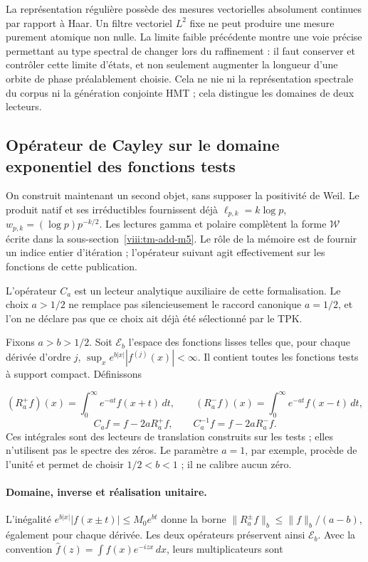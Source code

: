 La représentation régulière possède des mesures vectorielles absolument continues par rapport à Haar. Un filtre vectoriel \(L^2\) fixe ne peut produire une mesure purement atomique non nulle. La limite faible précédente montre une voie précise permettant au type spectral de changer lors du raffinement : il faut conserver et contrôler cette limite d'états, et non seulement augmenter la longueur d'une orbite de phase préalablement choisie. Cela ne nie ni la représentation spectrale du corpus ni la génération conjointe HMT ; cela distingue les domaines de deux lecteurs.


\subsection{Opérateur de Cayley sur le domaine exponentiel des fonctions tests}
\label{viii:tm-add-m4}
On construit maintenant un second objet, sans supposer la positivité de Weil. Le produit natif et ses irréductibles fournissent déjà \(\ell_{p,k}=k\log p\), \(w_{p,k}=(\log p)p^{-k/2}\). Les lectures gamma et polaire complètent la forme \(\mathscr W\) écrite dans la sous-section~\ref{viii:tm-add-m5}. Le rôle de la mémoire est de fournir un indice entier d'itération ; l'opérateur suivant agit effectivement sur les fonctions de cette publication.

L'opérateur \(C_a\) est un lecteur analytique auxiliaire de cette formalisation. Le choix \(a>1/2\) ne remplace pas silencieusement le raccord canonique \(a=1/2\), et l'on ne déclare pas que ce choix ait déjà été sélectionné par le TPK.

Fixons \(a>b>1/2\). Soit \(\mathscr E_b\) l'espace des fonctions lisses telles que, pour chaque dérivée d'ordre \(j\), \(\sup_x e^{b|x|}|f^{(j)}(x)|<\infty\). Il contient toutes les fonctions tests à support compact. Définissons

\[
(R_a^+f)(x)=\int_0^\infty e^{-at}f(x+t)\,dt,
\qquad
(R_a^-f)(x)=\int_0^\infty e^{-at}f(x-t)\,dt,
\]
\[
\boxed{C_af=f-2aR_a^+f,\qquad C_a^{-1}f=f-2aR_a^-f.}
\]
Ces intégrales sont des lecteurs de translation construits sur les tests ; elles n'utilisent pas le spectre des zéros. Le paramètre \(a=1\), par exemple, procède de l'unité et permet de choisir \(1/2<b<1\) ; il ne calibre aucun zéro.

\paragraph{Domaine, inverse et réalisation unitaire.} L'inégalité \(e^{b|x|}|f(x\pm t)|\le M_0e^{bt}\) donne la borne \(\|R_a^\pm f\|_b\le\|f\|_b/(a-b)\), également pour chaque dérivée. Les deux opérateurs préservent ainsi \(\mathscr E_b\). Avec la convention \(\widehat f(z)=\int f(x)e^{-izx}\,dx\), leurs multiplicateurs sont

